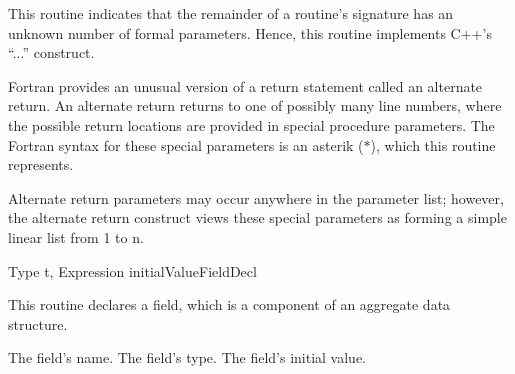 \begin{functionality}
This routine indicates that the remainder of a routine's signature has
an unknown number of formal parameters.  Hence, this routine
implements C++'s ``...'' construct.
\end{functionality}

\begin{functionality}
Fortran provides an unusual version of a return statement called an
alternate return.  An alternate return returns to one of possibly
many line numbers, where the possible return locations are provided in
special procedure parameters.  The Fortran syntax for these special
parameters is an asterik ($*$), which this routine represents.

Alternate return parameters may occur anywhere in the parameter list;
however, the alternate return construct views these special parameters
as forming a simple linear list from 1 to n.
\end{functionality}

	{Type t, Expression initialValue}{FieldDecl}
\begin{functionality}
This routine declares a field, which is a component of an aggregate
data structure.

\begin{Parameters}
 The field's name.
 The field's type.
 The field's initial value.
\end{Parameters}
\end{functionality}


